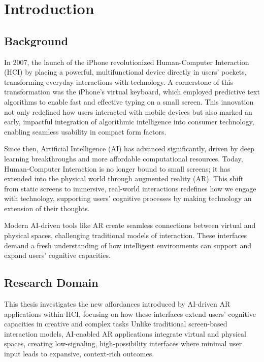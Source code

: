 
\section{Introduction}

\subsection{Background}

In 2007, the launch of the iPhone revolutionized Human-Computer Interaction (HCI) by placing a powerful, multifunctional device directly in users' pockets, transforming everyday interactions with technology.
A cornerstone of this transformation was the iPhone's virtual keyboard, which employed predictive text algorithms to enable fast and effective typing on a small screen.
This innovation not only redefined how users interacted with mobile devices but also marked an early, impactful integration of algorithmic intelligence into consumer technology, enabling seamless usability in compact form factors.

Since then, Artificial Intelligence (AI) has advanced significantly, driven by deep learning breakthroughs and more affordable computational resources.
Today, Human-Computer Interaction is no longer bound to small screens; it has extended into the physical world through augmented reality (AR).
This shift from static screens to immersive, real-world interactions redefines how we engage with technology, supporting users’ cognitive processes by making technology an extension of their thoughts.

Modern AI-driven tools like AR create seamless connections between virtual and physical spaces, challenging traditional models of interaction.
These interfaces demand a fresh understanding of how intelligent environments can support and expand users' cognitive capacities.


\subsection{Research Domain}

This thesis investigates the new affordances introduced by AI-driven AR applications within HCI, focusing on how these interfaces extend users' cognitive capacities in creative and complex tasks
Unlike traditional screen-based interaction models, AI-enabled AR applications integrate virtual and physical spaces, creating low-signaling, high-possibility interfaces where minimal user input leads to expansive, context-rich outcomes.

